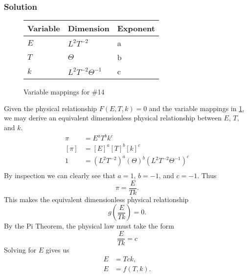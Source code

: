 \documentclass[12pt]{article}
\begin{document}
  \subsubsection*{Solution}
  \begin{figure}
    \centering
    \begin{tabularx}{0.5\textwidth}{XXX}
      Variable & Dimension & Exponent \\ \midrule
      $E$ & $L^2T^{-2}$ & a \\
      $T$ & $\Theta$ & b \\
      $k$ & $L^2T^{-2}\Theta^{-1}$ & c \\
    \end{tabularx}
    \caption{Variable mappings for \#14}
\label{fig:14-var-mappings}
  \end{figure}
  Given the physical relationship $F(E,T,k)=0$ and the variable mappings in
  \cref{fig:14-var-mappings}, we may derive an equivalent dimensionless physical
  relationship between $E$, $T$, and $k$.
  \begin{equation*}
    \begin{aligned}
      \pi &= E^a T^b k^c \\
      [\pi] &= {[E]}^a {[T]}^b {[k]}^c \\
      1 &= {(L^2T^{-2})}^a {(\Theta)}^{b} {(L^2T^{-2}\Theta^{-1})}^c \\
    \end{aligned}
  \end{equation*}
  By inspection we can clearly see that $a=1$, $b=-1$, and $c=-1$. Thus
  \begin{equation*}
    \pi = \frac{E}{Tk}.
  \end{equation*}
  This makes the equivalent dimensionless physical relationship
  \begin{equation*}
    g\left(\frac{E}{Tk}\right) = 0.
  \end{equation*}
  By the Pi Theorem, the physical law must take the form
  \begin{equation*}
    \frac{E}{Tk} = c
  \end{equation*}
  Solving for $E$ gives us
  \begin{equation*}
    \boxed{
      \begin{aligned}
        E &= Tck, \\
        E &= f(T,k). \\
      \end{aligned}
    }
  \end{equation*}
\end{document}
